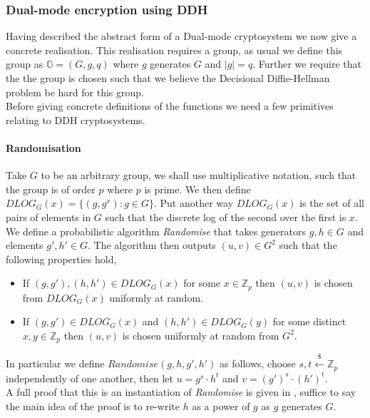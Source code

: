 \documentclass[ %
                    author={Nicholas Tutte},
                supervisor={Prof. Nigel Smart},
                    degree={MEng},
                     title={Secure Two Party Computation},
                  subtitle={A practical comparison of recent protocols},
                      type={Research - GG1K},
                      year={2015} ]{dissertation}
\begin{document}
				\subsubsection{Dual-mode encryption using DDH}

					Having described the abstract form of a Dual-mode cryptosystem we now give a concrete realisation. This realisation requires a group, as usual we define this group as $\mathbb{G} = (G, g, q)$ where $g$ generates $G$ and $|g| = q$. Further we require that the the group is chosen such that we believe the Decisional Diffie-Hellman problem be hard for this group.\\

					Before giving concrete definitions of the functions we need a few primitives relating to DDH cryptosystems.
					
					\paragraph{Randomisation} Take $G$ to be an arbitrary group, we shall use multiplicative notation, such that the group is of order $p$ where $p$ is prime. We then define $DLOG_G(x) = \{ (g, g^x) : g \in G\}$. Put another way $DLOG_G(x)$ is the set of all pairs of elements in $G$ such that the discrete log of the second over the first is $x$.\\
					
					We define a probabilistic algorithm \emph{Randomise} that takes generators $g,h \in G$ and elements $g', h' \in G$. The algorithm then outputs $(u, v) \in G^2$ such that the following properties hold,
					
					\begin{itemize}
						\item If $(g, g'), (h, h') \in DLOG_G(x)$ for some $x \in \mathbb{Z}_p$ then $(u, v)$ is chosen from $DLOG_G(x)$ uniformly at random.

						\item If $(g, g')\in DLOG_G(x)$ and $(h, h') \in DLOG_G(y)$ for some distinct $x, y \in \mathbb{Z}_p$ then $(u, v)$ is chosen uniformly at random from $G^2$.
					\end{itemize}

					In particular we define $Randomise(g, h, g', h')$ as follows, choose $s, t \xleftarrow{\$} \mathbb{Z}_p$ independently of one another, then let $u = g^s \cdot h^t$ and $v = (g')^s \cdot (h')^t$.\\

					A full proof that this is an instantiation of \emph{Randomise} is given in \cite{PVW_OT_2008}, suffice to say the main idea of the proof is to re-write $h$ as a power of $g$ as $g$ generates $G$.\\
\end{document}
